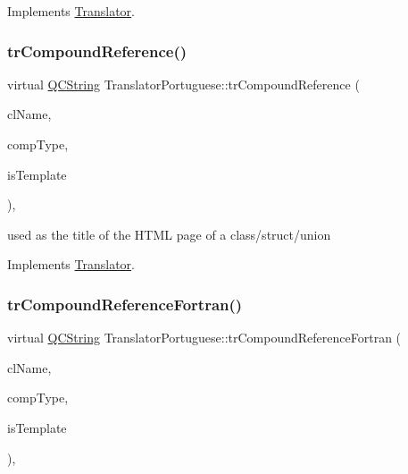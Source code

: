 Implements \mbox{\hyperlink{class_translator}{Translator}}.

\mbox{\label{class_translator_portuguese_ae15304024883a04e35c5bc568d706b51}} 
\subsubsection{\texorpdfstring{trCompoundReference()}{trCompoundReference()}}
{\footnotesize\ttfamily virtual \mbox{\hyperlink{class_q_c_string}{Q\+C\+String}} Translator\+Portuguese\+::tr\+Compound\+Reference (\begin{DoxyParamCaption}\item[{const char $\ast$}]{cl\+Name,  }\item[{\mbox{\hyperlink{class_class_def_ae70cf86d35fe954a94c566fbcfc87939}{Class\+Def\+::\+Compound\+Type}}}]{comp\+Type,  }\item[{bool}]{is\+Template }\end{DoxyParamCaption})\hspace{0.3cm}{\ttfamily [inline]}, {\ttfamily [virtual]}}

used as the title of the H\+T\+ML page of a class/struct/union 

Implements \mbox{\hyperlink{class_translator}{Translator}}.

\mbox{\label{class_translator_portuguese_aea1e34a1ca649b821afa250d2f105c14}} 
\subsubsection{\texorpdfstring{trCompoundReferenceFortran()}{trCompoundReferenceFortran()}}
{\footnotesize\ttfamily virtual \mbox{\hyperlink{class_q_c_string}{Q\+C\+String}} Translator\+Portuguese\+::tr\+Compound\+Reference\+Fortran (\begin{DoxyParamCaption}\item[{const char $\ast$}]{cl\+Name,  }\item[{\mbox{\hyperlink{class_class_def_ae70cf86d35fe954a94c566fbcfc87939}{Class\+Def\+::\+Compound\+Type}}}]{comp\+Type,  }\item[{bool}]{is\+Template }\end{DoxyParamCaption})\hspace{0.3cm}{\ttfamily [inline]}, {\ttfamily [virtual]}}

